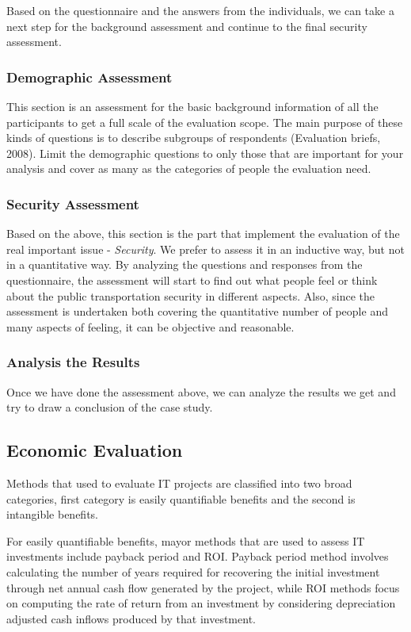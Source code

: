 \documentclass[twocolumn]{article}
\begin{document}
Based on the questionnaire and the answers from the individuals, we can take a next step for the background assessment and continue to the final security assessment.

\subsubsection{Demographic Assessment}
This section is an assessment for the basic background information of all the participants to get a full scale of the evaluation scope. The main purpose of these kinds of questions is to describe subgroups of respondents (Evaluation briefs, 2008). Limit the demographic questions to only those that are important for your analysis and cover as many as the categories of people the evaluation need.

\subsubsection{Security Assessment}
Based on the above, this section is the part that implement the evaluation of the real important issue - \emph{Security}. We prefer to assess it in an inductive way, but not in a quantitative way. By analyzing the questions and responses from the questionnaire, the assessment will start to find out what people feel or think about the public transportation security in different aspects. Also, since the assessment is undertaken both covering the quantitative number of people and many  aspects of feeling, it can be objective and reasonable.

\subsubsection{Analysis the Results}
Once we have done the assessment above, we can analyze the results we get and try to draw a conclusion of the case study.

\subsection{Economic Evaluation}
Methods that used to evaluate IT projects are classified into two broad categories, first category is easily quantifiable benefits and the second is intangible benefits.

For easily quantifiable benefits, mayor methods that are used to assess IT investments include payback period and ROI. Payback period method involves calculating the number of years required for recovering the initial investment through net annual cash flow generated by the project, while ROI methods focus on computing the rate of return from an investment by considering depreciation adjusted cash inflows produced by that investment.
\end{document}
